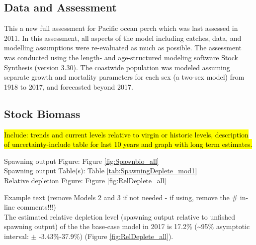 \documentclass[12pt,]{article}
\begin{document}
\subsection*{Data and Assessment}\label{data-and-assessment}

This a new full assessment for Pacific ocean perch which was last
assessed in 2011. In this assessment, all aspects of the model including
catches, data, and modelling assumptions were re-evaluated as much as
possible. The assessment was conducted using the length- and
age-structured modeling software Stock Synthesis (version 3.30). The
coastwide population was modeled assuming separate growth and mortality
parameters for each sex (a two-sex model) from 1918 to 2017, and
forecasted beyond 2017.

\FloatBarrier

\subsection*{Stock Biomass}\label{stock-biomass}

\hl{Include: trends and current levels relative to virgin or historic levels, 
description of uncertainty-include table for last 10 years and graph with 
long term estimates.}

Spawning output Figure: Figure \ref{fig:Spawnbio_all}\\
Spawning output Table(s): Table \ref{tab:SpawningDeplete_mod1}\\
Relative depletion Figure: Figure \ref{fig:RelDeplete_all}

Example text (remove Models 2 and 3 if not needed - if using, remove the
\# in-line comments!!!)\\
The estimated relative depletion level (spawning output relative to
unfished spawning output) of the the base-case model in 2017 is 17.2\%
(\textasciitilde{}95\% asymptotic interval: \(\pm\) -3.43\%-37.9\%)
(Figure \ref{fig:RelDeplete_all}).

\FloatBarrier
\end{document}
